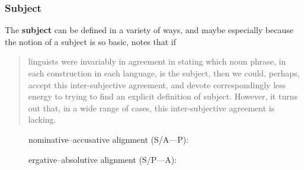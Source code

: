 \subsubsection{Subject}

The \textbf{subject} can be defined in a variety of ways, and maybe especially
because the notion of a subject is so basic, \citet{comrie1989} notes that if

\blockcquote[104]{comrie1989}{linguists were invariably in agreement in stating
which noun phrase, in each construction in each language, is the subject, then
we could, perhaps, accept this inter-subjective agreement, and devote
correspondingly less energy to trying to find an explicit definition of
subject. However, it turns out that, in a wide range of cases, this
inter-subjective agreement is lacking.}

\begin{figure}[t]
\pex\label{ex:subject}
\a\label{ex:subject_nomacc}%
nominative--accusative alignment (S/A---P):\medskip


\a\label{ex:subject_ergabs}%
ergative--absolutive alignment (S/P---A):\medskip


\xe
\end{figure}

